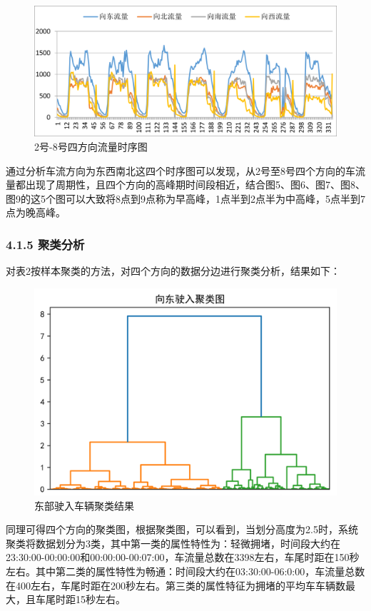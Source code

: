 \documentclass[UTF8]{article}
\begin{document}
        \begin{figure}[H]
            \includegraphics[width=\linewidth]{9.png}
            \caption{2号-8号四方向流量时序图}
        \end{figure}
        通过分析车流方向为东西南北这四个时序图可以发现，从2号至8号四个方向的车流量都出现了周期性，且四个方向的高峰期时间段相近，结合图5、图6、图7、图8、图9的这5个图可以大致将8点到9点称为早高峰，1点半到2点半为中高峰，5点半到7点为晚高峰。\\
        \subsubsection{4.1.5 聚类分析}
         对表2按样本聚类的方法，对四个方向的数据分边进行聚类分析，结果如下：\\
         \begin{figure}[H]
             \includegraphics[width=\linewidth]{10.png}
             \caption{东部驶入车辆聚类结果}
         \end{figure}
         同理可得四个方向的聚类图，根据聚类图，可以看到，当划分高度为2.5时，系统聚类将数据划分为3类，其中第一类的属性特性为：轻微拥堵，时间段大约在23:30:00-00:00:00和00:00:00-00:07:00，车流量总数在3398左右，车尾时距在150秒左右。其中第二类的属性特性为畅通：时间段大约在03:30:00-06:0:00，车流量总数在400左右，车尾时距在200秒左右。第三类的属性特征为拥堵的平均车车辆数最大，且车尾时距15秒左右。\\
\end{document}
